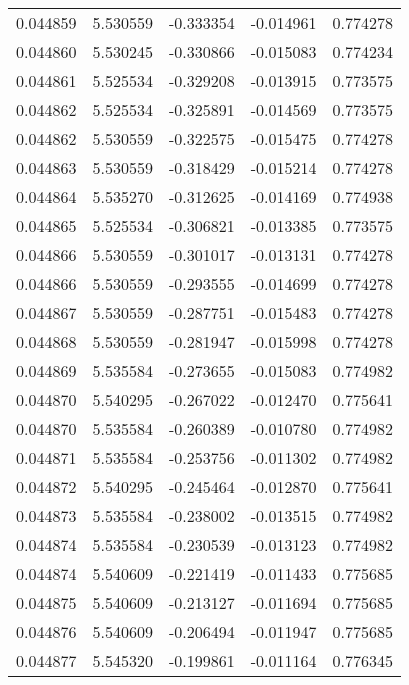 \begin{tabular}{lrrrr}
0.044859    &  5.530559 & -0.333354 & -0.014961 &             0.774278 \\
0.044860    &  5.530245 & -0.330866 & -0.015083 &             0.774234 \\
0.044861    &  5.525534 & -0.329208 & -0.013915 &             0.773575 \\
0.044862    &  5.525534 & -0.325891 & -0.014569 &             0.773575 \\
0.044862    &  5.530559 & -0.322575 & -0.015475 &             0.774278 \\
0.044863    &  5.530559 & -0.318429 & -0.015214 &             0.774278 \\
0.044864    &  5.535270 & -0.312625 & -0.014169 &             0.774938 \\
0.044865    &  5.525534 & -0.306821 & -0.013385 &             0.773575 \\
0.044866    &  5.530559 & -0.301017 & -0.013131 &             0.774278 \\
0.044866    &  5.530559 & -0.293555 & -0.014699 &             0.774278 \\
0.044867    &  5.530559 & -0.287751 & -0.015483 &             0.774278 \\
0.044868    &  5.530559 & -0.281947 & -0.015998 &             0.774278 \\
0.044869    &  5.535584 & -0.273655 & -0.015083 &             0.774982 \\
0.044870    &  5.540295 & -0.267022 & -0.012470 &             0.775641 \\
0.044870    &  5.535584 & -0.260389 & -0.010780 &             0.774982 \\
0.044871    &  5.535584 & -0.253756 & -0.011302 &             0.774982 \\
0.044872    &  5.540295 & -0.245464 & -0.012870 &             0.775641 \\
0.044873    &  5.535584 & -0.238002 & -0.013515 &             0.774982 \\
0.044874    &  5.535584 & -0.230539 & -0.013123 &             0.774982 \\
0.044874    &  5.540609 & -0.221419 & -0.011433 &             0.775685 \\
0.044875    &  5.540609 & -0.213127 & -0.011694 &             0.775685 \\
0.044876    &  5.540609 & -0.206494 & -0.011947 &             0.775685 \\
0.044877    &  5.545320 & -0.199861 & -0.011164 &             0.776345 \\

\end{tabular}
